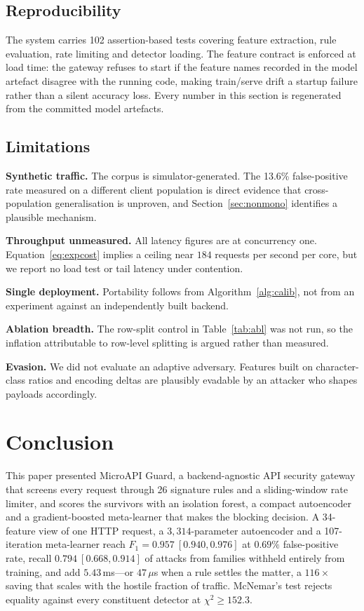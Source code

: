 \documentclass[conference]{IEEEtran}
\begin{document}
\subsection{Reproducibility}
The system carries 102 assertion-based tests covering feature extraction, rule evaluation,
rate limiting and detector loading. The feature contract is enforced at load time: the gateway
refuses to start if the feature names recorded in the model artefact disagree with the running
code, making train/serve drift a startup failure rather than a silent accuracy loss. Every
number in this section is regenerated from the committed model artefacts.

\subsection{Limitations}
\textbf{Synthetic traffic.} The corpus is simulator-generated. The 13.6\% false-positive rate
measured on a different client population is direct evidence that cross-population
generalisation is unproven, and Section~\ref{sec:nonmono} identifies a plausible mechanism.

\textbf{Throughput unmeasured.} All latency figures are at concurrency one.
Equation~\eqref{eq:expcost} implies a ceiling near $184$ requests per second per core, but we
report no load test or tail latency under contention.

\textbf{Single deployment.} Portability follows from Algorithm~\ref{alg:calib}, not from an
experiment against an independently built backend.

\textbf{Ablation breadth.} The row-split control in Table~\ref{tab:abl} was not run, so the
inflation attributable to row-level splitting is argued rather than measured.

\textbf{Evasion.} We did not evaluate an adaptive adversary. Features built on character-class
ratios and encoding deltas are plausibly evadable by an attacker who shapes payloads
accordingly.

\section{Conclusion}
\label{sec:concl}
This paper presented MicroAPI Guard, a backend-agnostic API security gateway that screens
every request through 26 signature rules and a sliding-window rate limiter, and scores the
survivors with an isolation forest, a compact autoencoder and a gradient-boosted meta-learner
that makes the blocking decision. A 34-feature view of one HTTP request, a
$3{,}314$-parameter autoencoder and a 107-iteration meta-learner reach $F_1=0.957\
[0.940,0.976]$ at $0.69\%$ false-positive rate, recall $0.794\ [0.668,0.914]$ of attacks from
families withheld entirely from training, and add $5.43$\,ms---or $47\,\mu$s when a rule
settles the matter, a $116\times$ saving that scales with the hostile fraction of traffic.
McNemar's test rejects equality against every constituent detector at $\chi^2\ge152.3$.
\end{document}

